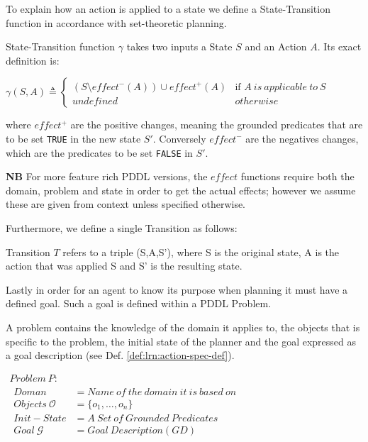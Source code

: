 \documentclass[../Master.tex]{subfiles}
\begin{document}
To explain how an action is applied to a state we define a State-Transition function in accordance with set-theoretic planning.


\begin{definition} 
	State-Transition function $\gamma$ takes two inputs a State $S$ and an Action $A$. Its exact definition is:

	$\gamma(S,A) \triangleq 
	\left\{
	\begin{array}{ll}
		(S \setminus effect^-(A)) \cup effect^+(A) & \mbox{if } A~is~applicable~to~S  \\		
		undefined & otherwise 
	\end{array}
	\right.$ 
	
	where $effect^+$ are the positive changes, meaning the grounded predicates that are to be set \texttt{TRUE} in the new state $S'$. Conversely $effect^-$ are the negatives changes, which are the predicates to be set \texttt{FALSE} in $S'$. 
	
	\textbf{NB} For more feature rich PDDL versions, the $effect$ functions require both the domain, problem and state in order to get the actual effects; however we assume these are given from context unless specified otherwise.
	
\end{definition}

Furthermore, we define a single Transition as follows:

\begin{definition} 
	Transition $T$ refers to a triple (S,A,S'), where S is the original state, A is the action that was applied S and S' is the resulting state.
\end{definition}

Lastly in order for an agent to know its purpose when planning it must have a defined goal. Such a goal is defined within a PDDL Problem.

\begin{definition} A problem contains the knowledge of the domain it applies to, the objects that is specific to the problem, the initial state of the planner and the goal expressed as a goal description (see Def.  \ref{def:lrn:action-spec-def}).
	
	$
	\begin{array}{ll}
	Problem ~ P: & \\
	
	\begin{array}{ll}
	Doman & = Name ~ of ~ the ~ domain ~ it ~ is ~ based ~ on \\
	Objects ~ \mathcal{O} & = \{o_1,\dots,o_n\}			 \\  
	Init-State& = A ~ Set ~ of ~ Grounded ~ Predicates \\
	Goal ~ \mathcal{G} & = Goal ~ Description(GD)
	\end{array}
	\end{array}$
\end{definition}
\end{document}
